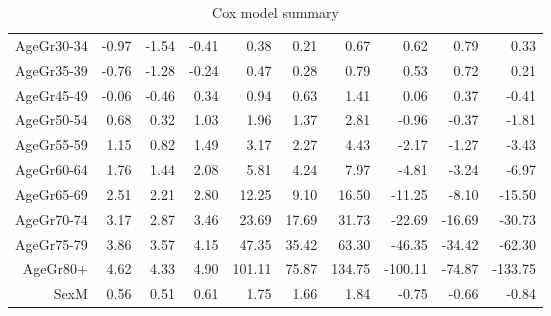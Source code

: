 \begin{table}[ht]
\begin{tabular}{rrrrrrrrrr}
  AgeGr30-34 & -0.97 & -1.54 & -0.41 & 0.38 & 0.21 & 0.67 & 0.62 & 0.79 & 0.33 \\ 
  AgeGr35-39 & -0.76 & -1.28 & -0.24 & 0.47 & 0.28 & 0.79 & 0.53 & 0.72 & 0.21 \\ 
  AgeGr45-49 & -0.06 & -0.46 & 0.34 & 0.94 & 0.63 & 1.41 & 0.06 & 0.37 & -0.41 \\ 
  AgeGr50-54 & 0.68 & 0.32 & 1.03 & 1.96 & 1.37 & 2.81 & -0.96 & -0.37 & -1.81 \\ 
  AgeGr55-59 & 1.15 & 0.82 & 1.49 & 3.17 & 2.27 & 4.43 & -2.17 & -1.27 & -3.43 \\ 
  AgeGr60-64 & 1.76 & 1.44 & 2.08 & 5.81 & 4.24 & 7.97 & -4.81 & -3.24 & -6.97 \\ 
  AgeGr65-69 & 2.51 & 2.21 & 2.80 & 12.25 & 9.10 & 16.50 & -11.25 & -8.10 & -15.50 \\ 
  AgeGr70-74 & 3.17 & 2.87 & 3.46 & 23.69 & 17.69 & 31.73 & -22.69 & -16.69 & -30.73 \\ 
  AgeGr75-79 & 3.86 & 3.57 & 4.15 & 47.35 & 35.42 & 63.30 & -46.35 & -34.42 & -62.30 \\ 
  AgeGr80+ & 4.62 & 4.33 & 4.90 & 101.11 & 75.87 & 134.75 & -100.11 & -74.87 & -133.75 \\ 
  SexM & 0.56 & 0.51 & 0.61 & 1.75 & 1.66 & 1.84 & -0.75 & -0.66 & -0.84 \\ 
   \hline
\end{tabular}
\caption{Cox model summary} 
\end{table}
